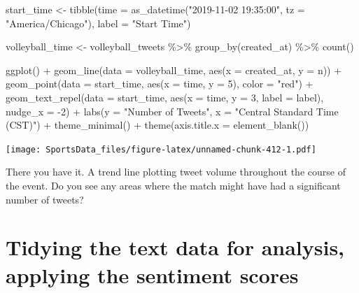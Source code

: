 \documentclass[
]{book}
\newenvironment{Shaded}{\begin{snugshade}}{\end{snugshade}}
\newcommand{\AttributeTok}[1]{\textcolor[rgb]{0.77,0.63,0.00}{#1}}
\newcommand{\DecValTok}[1]{\textcolor[rgb]{0.00,0.00,0.81}{#1}}
\newcommand{\FunctionTok}[1]{\textcolor[rgb]{0.00,0.00,0.00}{#1}}
\newcommand{\NormalTok}[1]{#1}
\newcommand{\OtherTok}[1]{\textcolor[rgb]{0.56,0.35,0.01}{#1}}
\newcommand{\SpecialCharTok}[1]{\textcolor[rgb]{0.00,0.00,0.00}{#1}}
\newcommand{\StringTok}[1]{\textcolor[rgb]{0.31,0.60,0.02}{#1}}
\begin{document}
\begin{Shaded}
\begin{Highlighting}[]
\NormalTok{start\_time }\OtherTok{\textless{}{-}} \FunctionTok{tibble}\NormalTok{(}\AttributeTok{time =} \FunctionTok{as\_datetime}\NormalTok{(}\StringTok{"2019{-}11{-}02 19:35:00"}\NormalTok{, }\AttributeTok{tz =} \StringTok{"America/Chicago"}\NormalTok{), }\AttributeTok{label =} \StringTok{"Start Time"}\NormalTok{) }

\NormalTok{volleyball\_time }\OtherTok{\textless{}{-}}\NormalTok{ volleyball\_tweets }\SpecialCharTok{\%\textgreater{}\%}
  \FunctionTok{group\_by}\NormalTok{(created\_at) }\SpecialCharTok{\%\textgreater{}\%} 
  \FunctionTok{count}\NormalTok{()}

\FunctionTok{ggplot}\NormalTok{() }\SpecialCharTok{+}
  \FunctionTok{geom\_line}\NormalTok{(}\AttributeTok{data =}\NormalTok{ volleyball\_time, }\FunctionTok{aes}\NormalTok{(}\AttributeTok{x =}\NormalTok{ created\_at, }\AttributeTok{y =}\NormalTok{ n)) }\SpecialCharTok{+}
  \FunctionTok{geom\_point}\NormalTok{(}\AttributeTok{data =}\NormalTok{ start\_time, }\FunctionTok{aes}\NormalTok{(}\AttributeTok{x =}\NormalTok{ time, }\AttributeTok{y =} \DecValTok{5}\NormalTok{), }\AttributeTok{color =} \StringTok{"red"}\NormalTok{) }\SpecialCharTok{+}
  \FunctionTok{geom\_text\_repel}\NormalTok{(}\AttributeTok{data =}\NormalTok{ start\_time, }\FunctionTok{aes}\NormalTok{(}\AttributeTok{x =}\NormalTok{ time, }\AttributeTok{y =} \DecValTok{3}\NormalTok{, }\AttributeTok{label =}\NormalTok{ label), }\AttributeTok{nudge\_x =} \SpecialCharTok{{-}}\DecValTok{2}\NormalTok{) }\SpecialCharTok{+}
  \FunctionTok{labs}\NormalTok{(}\AttributeTok{y =} \StringTok{"Number of Tweets"}\NormalTok{,}
       \AttributeTok{x =} \StringTok{"Central Standard Time (CST)"}\NormalTok{) }\SpecialCharTok{+}
  \FunctionTok{theme\_minimal}\NormalTok{() }\SpecialCharTok{+}
  \FunctionTok{theme}\NormalTok{(}\AttributeTok{axis.title.x =} \FunctionTok{element\_blank}\NormalTok{())}
\end{Highlighting}
\end{Shaded}

\texttt{[image: SportsData\_files/figure-latex/unnamed-chunk-412-1.pdf]}

There you have it. A trend line plotting tweet volume throughout the course of the event. Do you see any areas where the match might have had a significant number of tweets?

\hypertarget{tidying-the-text-data-for-analysis-applying-the-sentiment-scores}{%
\section{Tidying the text data for analysis, applying the sentiment scores}\label{tidying-the-text-data-for-analysis-applying-the-sentiment-scores}}
\end{document}
